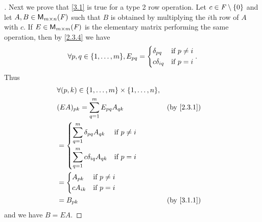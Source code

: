 \begin{proof}[]
  Next we prove that \cref{3.1} is true for a type 2 row operation.
  Let \(c \in \mathit{F} \setminus \left\lbrace0\right\rbrace\) and let \(A, B \in \mathsf{M}_{{m} \times n}({\mathit{F}})\) such that \(B\) is obtained by multiplying the \(i\)th row of \(A\) with \(c\).
  If \(E \in \mathsf{M}_{{m} \times m}({\mathit{F}})\) is the elementary matrix performing the same operation, then by \cref{2.3.4} we have
  \[
    \forall p, q \in \set{1, \dots, m}, E_{p q} = \begin{dcases}
      \delta_{p q}   & \text{if } p \neq i \\
      c \delta_{i q} & \text{if } p = i
    \end{dcases}.
  \]
  Thus
  \begin{align*}
     & \forall (p, k) \in \set{1, \dots, m} \times \set{1, \dots, n},                               \\
     & (EA)_{p k} = \sum_{q = 1}^m E_{p q} A_{q k}                    &  & \text{(by \cref{2.3.1})} \\
     & = \begin{dcases}
           \sum_{q = 1}^m \delta_{p q} A_{q k}   & \text{if } p \neq i \\
           \sum_{q = 1}^m c \delta_{i q} A_{q k} & \text{if } p = i
         \end{dcases}                                \\
     & = \begin{dcases}
           A_{p k}   & \text{if } p \neq i \\
           c A_{i k} & \text{if } p = i
         \end{dcases}                                                            \\
     & = B_{p k}                                                      &  & \text{(by \cref{3.1.1})}
  \end{align*}
  and we have \(B = EA\).


\end{proof}
